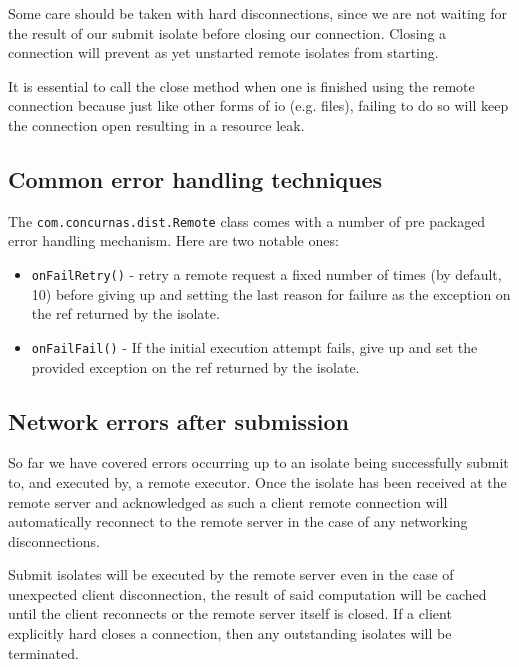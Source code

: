 \documentclass[conc-doc]{subfiles}
\begin{document}
Some care should be taken with hard disconnections, since we are not waiting for the result of our submit isolate before closing our connection. Closing a connection will prevent as yet unstarted remote isolates from starting.

It is essential to call the close method when one is finished using the remote connection because just like other forms of io (e.g. files), failing to do so will keep the connection open resulting in a resource leak.

\subsection{Common error handling techniques}
The \lstinline{com.concurnas.dist.Remote} class comes with a number of pre packaged error handling mechanism. Here are two notable ones:

\begin{itemize}
	\item \lstinline{onFailRetry()} - retry a remote request a fixed number of times (by default, 10) before giving up and setting the last reason for failure as the exception on the ref returned by the isolate.
	\item \lstinline{onFailFail()} - If the initial execution attempt fails, give up and set the provided exception on the ref returned by the isolate.
\end{itemize}

\subsection{Network errors after submission}
So far we have covered errors occurring up to an isolate being successfully submit to, and executed by, a remote executor. Once the isolate has been received at the remote server and acknowledged as such a client remote connection will automatically reconnect to the remote server in the case of any networking disconnections.

Submit isolates will be executed by the remote server even in the case of unexpected client disconnection, the result of said computation will be cached until the client reconnects or the remote server itself is closed. If a client explicitly hard closes a connection, then any outstanding isolates will be terminated.

\end{document}
